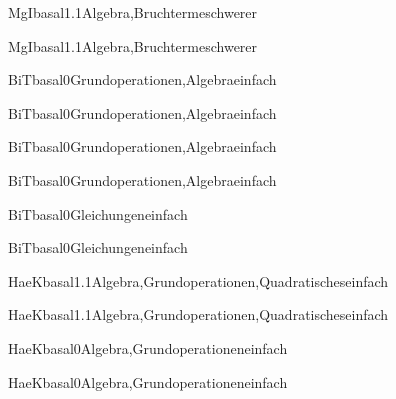\documentclass[12pt]{article}
\begin{document}
    \begin{Add}{MgI}{basal1.1}{Algebra,Bruchterme}{schwerer}
    \solution{ }
    \end{Add}
    \begin{Add}{MgI}{basal1.1}{Algebra,Bruchterme}{schwerer}
    \end{Add}
    

\begin{Add}{BiT}{basal0}{Grundoperationen,Algebra}{einfach}
\solution{ }
\end{Add}
\begin{Add}{BiT}{basal0}{Grundoperationen,Algebra}{einfach}
\end{Add}

\begin{Add}{BiT}{basal0}{Grundoperationen,Algebra}{einfach}
\solution{ }
\end{Add}
\begin{Add}{BiT}{basal0}{Grundoperationen,Algebra}{einfach}
\end{Add}

\begin{Add}{BiT}{basal0}{Gleichungen}{einfach}
\solution{ }
\end{Add}
\begin{Add}{BiT}{basal0}{Gleichungen}{einfach}
\end{Add}

\begin{Add}{HaeK}{basal1.1}{Algebra,Grundoperationen,Quadratisches}{einfach}
\solution{ }
\end{Add}
\begin{Add}{HaeK}{basal1.1}{Algebra,Grundoperationen,Quadratisches}{einfach}
\end{Add}

\begin{Add}{HaeK}{basal0}{Algebra,Grundoperationen}{einfach}
\solution{ }
\end{Add}
\begin{Add}{HaeK}{basal0}{Algebra,Grundoperationen}{einfach}
\end{Add}
\end{document}

